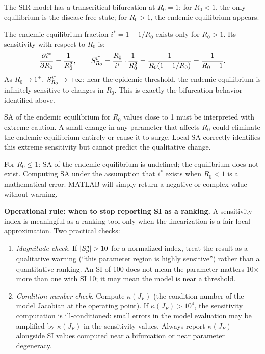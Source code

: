 The SIR model has a transcritical bifurcation at $R_0 = 1$:
for $R_0 < 1$, the only equilibrium is the disease-free state;
for $R_0 > 1$, the endemic equilibrium appears.

The endemic equilibrium fraction
$i^* = 1 - 1/R_0$
exists only for $R_0 > 1$. Its sensitivity with respect to $R_0$ is:
\[
  \frac{\partial i^*}{\partial R_0} = \frac{1}{R_0^2}, \qquad
  S_{R_0}^{i^*} = \frac{R_0}{i^*}\cdot\frac{1}{R_0^2}
                = \frac{1}{R_0(1-1/R_0)} = \frac{1}{R_0 - 1}.
\]
As $R_0 \to 1^+$, $S_{R_0}^{i^*} \to +\infty$: near the epidemic
threshold, the endemic equilibrium is infinitely sensitive to changes
in $R_0$. This is exactly the bifurcation behavior identified above.

SA of the endemic equilibrium for $R_0$ values close to 1 must be
interpreted with extreme caution. A small change in any parameter
that affects $R_0$ could eliminate the endemic equilibrium entirely
or cause it to surge. Local SA correctly identifies this extreme
sensitivity but cannot predict the qualitative change.

For $R_0 \leq 1$: SA of the endemic equilibrium is undefined;
the equilibrium does not exist. Computing SA under the assumption
that $i^*$ exists when $R_0 < 1$ is a mathematical error.
MATLAB will simply return a negative or complex value without warning.

\medskip\noindent
\textbf{Operational rule: when to stop reporting SI as a ranking.}
A sensitivity index is meaningful as a ranking tool only when
the linearization is a fair local approximation.
Two practical checks:

\begin{enumerate}[nosep]
\item \textit{Magnitude check.} If $|S_{p}^{q}| > 10$ for a normalized
      index, treat the result as a qualitative warning
      (``this parameter region is highly sensitive'') rather than a
      quantitative ranking. An SI of 100 does not mean the parameter
      matters 10$\times$ more than one with SI 10;
      it may mean the model is near a threshold.
\item \textit{Condition-number check.} Compute $\kappa(J_F)$
      (the condition number of the model Jacobian at the operating point).
      If $\kappa(J_F) > 10^4$, the sensitivity computation is
      ill-conditioned: small errors in the model evaluation
      may be amplified by $\kappa(J_F)$ in the sensitivity values.
      Always report $\kappa(J_F)$ alongside SI values computed
      near a bifurcation or near parameter degeneracy.
\end{enumerate}


